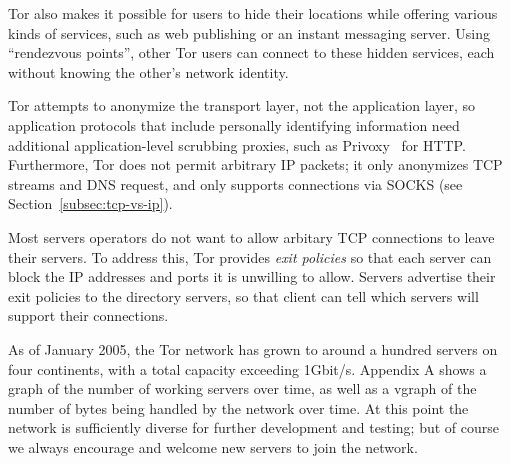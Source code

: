 \documentclass{llncs}
\begin{document}
Tor also makes it possible for users to hide their locations while
offering various kinds of services, such as web publishing or an instant
messaging server. Using ``rendezvous points'', other Tor users can
connect to these hidden services, each without knowing the other's network
identity.

Tor attempts to anonymize the transport layer, not the application layer, so
application protocols that include personally identifying information need
additional application-level scrubbing proxies, such as
Privoxy~\cite{privoxy} for HTTP.  Furthermore, Tor does not permit arbitrary
IP packets; it only anonymizes TCP streams and DNS request, and only supports
connections via SOCKS (see Section~\ref{subsec:tcp-vs-ip}).

Most servers operators do not want to allow arbitary TCP connections to leave
their servers.  To address this, Tor provides \emph{exit policies} so that
each server can block the IP addresses and ports it is unwilling to allow.
Servers advertise their exit policies to the directory servers, so that
client can tell which servers will support their connections.

As of January 2005, the Tor network has grown to around a hundred servers
on four continents, with a total capacity exceeding 1Gbit/s. Appendix A
shows a graph of the number of working servers over time, as well as a
vgraph of the number of bytes being handled by the network over time. At
this point the network is sufficiently diverse for further development
and testing; but of course we always encourage and welcome new servers
to join the network.
\end{document}
